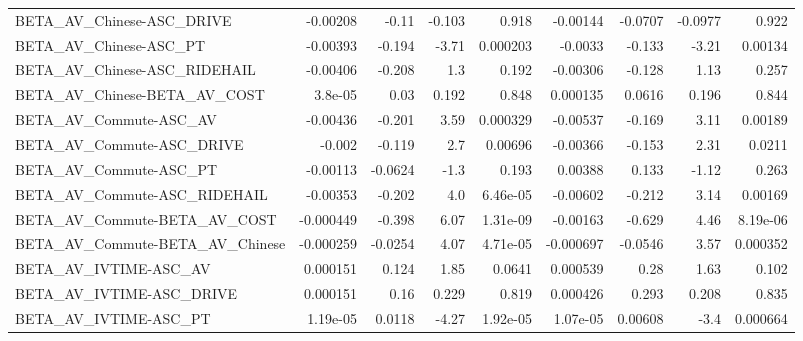\begin{tabular}{lrrrrrrrr}
BETA\_AV\_Chinese-ASC\_DRIVE                          &    -0.00208 &        -0.11 &   -0.103 &    0.918 &   -0.00144 &     -0.0707 &      -0.0977 &         0.922 \\
BETA\_AV\_Chinese-ASC\_PT                             &    -0.00393 &       -0.194 &    -3.71 & 0.000203 &    -0.0033 &      -0.133 &        -3.21 &       0.00134 \\
BETA\_AV\_Chinese-ASC\_RIDEHAIL                       &    -0.00406 &       -0.208 &      1.3 &    0.192 &   -0.00306 &      -0.128 &         1.13 &         0.257 \\
BETA\_AV\_Chinese-BETA\_AV\_COST                       &     3.8e-05 &         0.03 &    0.192 &    0.848 &   0.000135 &      0.0616 &        0.196 &         0.844 \\
BETA\_AV\_Commute-ASC\_AV                             &    -0.00436 &       -0.201 &     3.59 & 0.000329 &   -0.00537 &      -0.169 &         3.11 &       0.00189 \\
BETA\_AV\_Commute-ASC\_DRIVE                          &      -0.002 &       -0.119 &      2.7 &  0.00696 &   -0.00366 &      -0.153 &         2.31 &        0.0211 \\
BETA\_AV\_Commute-ASC\_PT                             &    -0.00113 &      -0.0624 &     -1.3 &    0.193 &    0.00388 &       0.133 &        -1.12 &         0.263 \\
BETA\_AV\_Commute-ASC\_RIDEHAIL                       &    -0.00353 &       -0.202 &      4.0 & 6.46e-05 &   -0.00602 &      -0.212 &         3.14 &       0.00169 \\
BETA\_AV\_Commute-BETA\_AV\_COST                       &   -0.000449 &       -0.398 &     6.07 & 1.31e-09 &   -0.00163 &      -0.629 &         4.46 &      8.19e-06 \\
BETA\_AV\_Commute-BETA\_AV\_Chinese                    &   -0.000259 &      -0.0254 &     4.07 & 4.71e-05 &  -0.000697 &     -0.0546 &         3.57 &      0.000352 \\
BETA\_AV\_IVTIME-ASC\_AV                              &    0.000151 &        0.124 &     1.85 &   0.0641 &   0.000539 &        0.28 &         1.63 &         0.102 \\
BETA\_AV\_IVTIME-ASC\_DRIVE                           &    0.000151 &         0.16 &    0.229 &    0.819 &   0.000426 &       0.293 &        0.208 &         0.835 \\
BETA\_AV\_IVTIME-ASC\_PT                              &    1.19e-05 &       0.0118 &    -4.27 & 1.92e-05 &   1.07e-05 &     0.00608 &         -3.4 &      0.000664 \\

\end{tabular}
